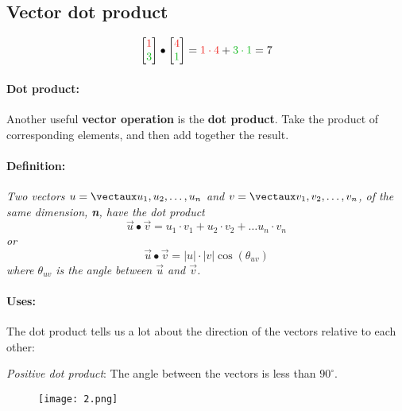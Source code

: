 \documentclass{article}
\begin{document}
\color{white}
\subsection{Vector dot product}
\color{black}

\begin{equation*}
 \icol{\color{rooj} 1 \\ \color{groen} 3 \color{black} } \bullet \icol{\color{rooj} 4 \\ \color{groen} 1 \color{black} } = \color{rooj} 1 \cdot 4  \color{black} + \color{groen}  3 \cdot 1 \color{black} = 7
\end{equation*}





\paragraph{Dot product:} Another useful \textbf{vector operation} is the \textbf{dot product}. Take the product of corresponding elements, and then add together the result. 

\color{theorem} \paragraph{Definition:} \textit{Two vectors $u=\vect{u_1, u_2,\dots,u_n}$ and $v=\vect{v_1,v_2,\dots,v_n}$, of the same dimension, \textbf{n}, have the dot product 
\[
\vec{u}\bullet \vec{v} = u_1\cdot v_1 + u_2\cdot v_2+ \dots u_n\cdot v_n 
\]
or
\[
\vec{u}\bullet \vec{v} = |u|\cdot |v| \cos (\theta_{uv})
\]
where $\theta_{uv}$ is the angle between $\vec{u}$ and $\vec{v}$.
} \color{black}

\paragraph{Uses:} The dot product tells us a lot about the direction of the vectors relative to each other:


\begin{minipage}{0.45\textwidth}
\begin{flushleft}
\textit{Positive dot product}: The angle between the vectors is less than $90^\circ$. 
\end{flushleft}
\end{minipage} \hfill
\begin{minipage}{0.45\textwidth}
\begin{figure}[H]
\texttt{[image: 2.png]}
\end{figure}
\end{minipage}
\end{document}
